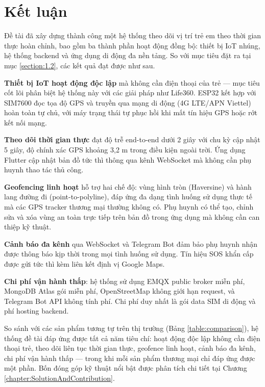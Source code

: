 \documentclass[../DoAn.tex]{subfiles}
\begin{document}
\section{Kết luận}
\label{section:6.1}

Đề tài đã xây dựng thành công một hệ thống theo dõi vị trí trẻ em theo thời gian thực hoàn chỉnh, bao gồm ba thành phần hoạt động đồng bộ: thiết bị IoT nhúng, hệ thống backend và ứng dụng di động đa nền tảng. So với mục tiêu đặt ra tại mục \ref{section:1.2}, các kết quả đạt được như sau.

\textbf{Thiết bị IoT hoạt động độc lập} mà không cần điện thoại của trẻ — mục tiêu cốt lõi phân biệt hệ thống này với các giải pháp như Life360. ESP32 kết hợp với SIM7600 đọc tọa độ GPS và truyền qua mạng di động (4G LTE/APN Viettel) hoàn toàn tự chủ, với máy trạng thái tự phục hồi khi mất tín hiệu GPS hoặc rớt kết nối mạng.

\textbf{Theo dõi thời gian thực} đạt độ trễ end-to-end dưới 2 giây với chu kỳ cập nhật 5 giây, độ chính xác GPS khoảng 3,2 m trong điều kiện ngoài trời. Ứng dụng Flutter cập nhật bản đồ tức thì thông qua kênh WebSocket mà không cần phụ huynh thao tác thủ công.

\textbf{Geofencing linh hoạt} hỗ trợ hai chế độ: vùng hình tròn (Haversine) và hành lang đường đi (point-to-polyline), đáp ứng đa dạng tình huống sử dụng thực tế mà các GPS tracker thương mại thường không có. Phụ huynh có thể tạo, chỉnh sửa và xóa vùng an toàn trực tiếp trên bản đồ trong ứng dụng mà không cần can thiệp kỹ thuật.

\textbf{Cảnh báo đa kênh} qua WebSocket và Telegram Bot đảm bảo phụ huynh nhận được thông báo kịp thời trong mọi tình huống sử dụng. Tín hiệu SOS khẩn cấp được gửi tức thì kèm liên kết định vị Google Maps.

\textbf{Chi phí vận hành thấp}: hệ thống sử dụng EMQX public broker miễn phí, MongoDB Atlas gói miễn phí, OpenStreetMap không giới hạn request, và Telegram Bot API không tính phí. Chi phí duy nhất là gói data SIM di động và phí hosting backend.

So sánh với các sản phẩm tương tự trên thị trường (Bảng \ref{table:comparison}), hệ thống đề tài đáp ứng được tất cả năm tiêu chí: hoạt động độc lập không cần điện thoại trẻ, theo dõi liên tục thời gian thực, geofence linh hoạt, cảnh báo đa kênh, chi phí vận hành thấp — trong khi mỗi sản phẩm thương mại chỉ đáp ứng được một phần. Bốn đóng góp kỹ thuật nổi bật được phân tích chi tiết tại Chương \ref{chapter:SolutionAndContribution}.
\end{document}
